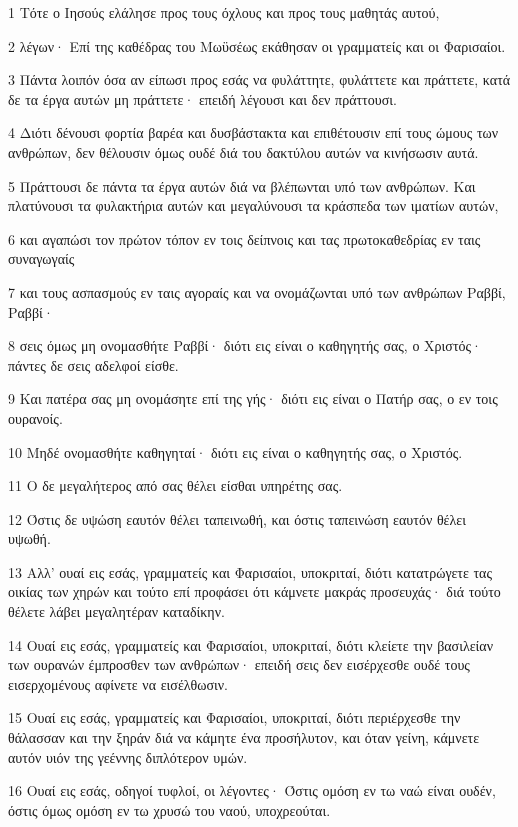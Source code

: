 \par 1 Τότε ο Ιησούς ελάλησε προς τους όχλους και προς τους μαθητάς αυτού,
\par 2 λέγων· Επί της καθέδρας του Μωϋσέως εκάθησαν οι γραμματείς και οι Φαρισαίοι.
\par 3 Πάντα λοιπόν όσα αν είπωσι προς εσάς να φυλάττητε, φυλάττετε και πράττετε, κατά δε τα έργα αυτών μη πράττετε· επειδή λέγουσι και δεν πράττουσι.
\par 4 Διότι δένουσι φορτία βαρέα και δυσβάστακτα και επιθέτουσιν επί τους ώμους των ανθρώπων, δεν θέλουσιν όμως ουδέ διά του δακτύλου αυτών να κινήσωσιν αυτά.
\par 5 Πράττουσι δε πάντα τα έργα αυτών διά να βλέπωνται υπό των ανθρώπων. Και πλατύνουσι τα φυλακτήρια αυτών και μεγαλύνουσι τα κράσπεδα των ιματίων αυτών,
\par 6 και αγαπώσι τον πρώτον τόπον εν τοις δείπνοις και τας πρωτοκαθεδρίας εν ταις συναγωγαίς
\par 7 και τους ασπασμούς εν ταις αγοραίς και να ονομάζωνται υπό των ανθρώπων Ραββί, Ραββί·
\par 8 σεις όμως μη ονομασθήτε Ραββί· διότι εις είναι ο καθηγητής σας, ο Χριστός· πάντες δε σεις αδελφοί είσθε.
\par 9 Και πατέρα σας μη ονομάσητε επί της γής· διότι εις είναι ο Πατήρ σας, ο εν τοις ουρανοίς.
\par 10 Μηδέ ονομασθήτε καθηγηταί· διότι εις είναι ο καθηγητής σας, ο Χριστός.
\par 11 Ο δε μεγαλήτερος από σας θέλει είσθαι υπηρέτης σας.
\par 12 Όστις δε υψώση εαυτόν θέλει ταπεινωθή, και όστις ταπεινώση εαυτόν θέλει υψωθή.
\par 13 Αλλ' ουαί εις εσάς, γραμματείς και Φαρισαίοι, υποκριταί, διότι κατατρώγετε τας οικίας των χηρών και τούτο επί προφάσει ότι κάμνετε μακράς προσευχάς· διά τούτο θέλετε λάβει μεγαλητέραν καταδίκην.
\par 14 Ουαί εις εσάς, γραμματείς και Φαρισαίοι, υποκριταί, διότι κλείετε την βασιλείαν των ουρανών έμπροσθεν των ανθρώπων· επειδή σεις δεν εισέρχεσθε ουδέ τους εισερχομένους αφίνετε να εισέλθωσιν.
\par 15 Ουαί εις εσάς, γραμματείς και Φαρισαίοι, υποκριταί, διότι περιέρχεσθε την θάλασσαν και την ξηράν διά να κάμητε ένα προσήλυτον, και όταν γείνη, κάμνετε αυτόν υιόν της γεέννης διπλότερον υμών.
\par 16 Ουαί εις εσάς, οδηγοί τυφλοί, οι λέγοντες· Όστις ομόση εν τω ναώ είναι ουδέν, όστις όμως ομόση εν τω χρυσώ του ναού, υποχρεούται.
